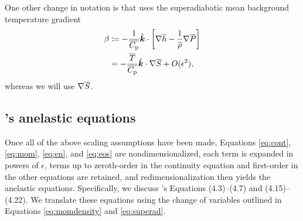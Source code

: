 \documentclass[12pt]{article}
\newcommand{\veck}{\hat{\bm{k}}}
\begin{document}
	 One other change in notation is that \citet{Gough1969} uses the superadiabatic mean background temperature gradient
	\begin{align}\label{eq:superad}
		\beta &\define -\frac{1}{\cpover}\veck\cdot\left[\nabla\overline{h}-\frac{1}{\rhoover}\nabla\prsover\right]\nonumber\\
		&=-\frac{\tmpover}{\cpover}\veck\dotgrad\entrover + O(\epsilon^2),
	\end{align}
	whereas we will use $\nabla \overline{S}$. 
	
	\subsection{\citet{Gough1969}'s anelastic equations}
	Once all of the above scaling assumptions have been made, Equations \eqref{eq:cont}, \eqref{eq:mom}, \eqref{eq:en}, and \eqref{eq:eos} are nondimensionalized, each term is expanded in powers of $\epsilon$, terms up to zeroth-order in the continuity equation and first-order in the other equations are retained, and redimensionalization then yields the anelastic equations. Specifically, we discuss \citet{Gough1969}'s Equations (4.3)--(4.7) and (4.15)--(4.22). We translate these equations using the change of variables outlined in Equations \eqref{eq:momdensity} and \eqref{eq:superad}. 
	
\end{document}
